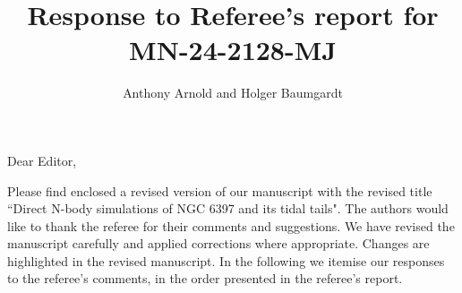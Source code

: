 \documentclass[aps,prl,reprint,showpacs,floatfix,superscriptaddress, onecolumn, 12pt]{revtex4-2}
\begin{document}

\title{Response to Referee's report for MN-24-2128-MJ}
\author{Anthony Arnold and Holger Baumgardt}

\maketitle

\noindent Dear Editor,

Please find enclosed a revised version of our manuscript with the revised title ``Direct N-body simulations of NGC 6397 and its tidal tails". The authors would like to thank the referee for their comments and suggestions. We have revised the manuscript carefully and applied corrections where appropriate. Changes are highlighted in the revised manuscript. In the following we itemise our responses to the referee's comments, in the order presented in the referee's report.

\vspace{1em}
\end{document}
